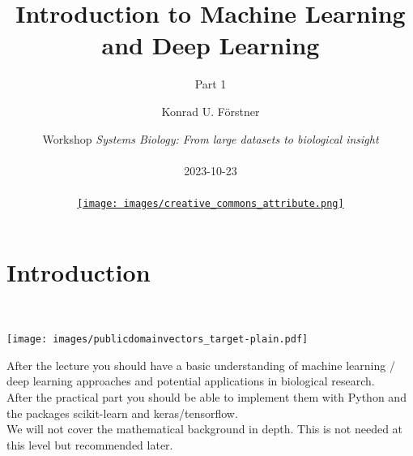 \documentclass[aspectratio=169]{beamer}
\title{Introduction to Machine Learning and Deep Learning }
\subtitle{Part 1}
\author{\small Konrad U. Förstner}
\institute{ZB MED -- Information Centre for Life Science \& TH Köln}
\date{\scriptsize 
  Workshop \textit{Systems Biology: From large datasets to biological insight}\\ \ \\
  2023-10-23\\\ \\
  \href{https://creativecommons.org/licenses/by/4.0/}{\texttt{[image: images/creative\_commons\_attribute.png]}}
}
\newcommand{\setfootercentertext}[1]{
  \setbeamertemplate{footline}{
    \hspace*{\fill}
    \raisebox{3mm}[0mm][0mm]{
      \tiny{#1}}\hspace*{\fill}}
}
\begin{document}

\begin{frame}{}
  \titlepage
\end{frame}
\logo{}

\setcounter{tocdepth}{1}
\begin{frame}{}
   \tableofcontents
\end{frame}

\section{Introduction}

\begin{frame}{}
   \tableofcontents[currentsection]
\end{frame}

\begin{frame}
  \begin{block}{}
    \vspace{0.5cm}
    \ \ \ \
    \begin{minipage}{0.10\textwidth}
      \begin{center}
        \texttt{[image: images/publicdomainvectors\_target-plain.pdf]}
      \end{center}        
    \end{minipage}
    \hfill
    \begin{minipage}{0.80\textwidth}
      After the lecture you should have a basic understanding of
      machine learning / deep learning approaches and potential
      applications in biological research.\\

      After the practical part you should be able to implement them
      with Python and the packages scikit-learn and keras/tensorflow.\\

      We will not cover the mathematical background in depth. This is
      not needed at this level but recommended later.
    \end{minipage}
    \vspace{0.3cm}
  \end{block}
\end{frame}

\end{document}
